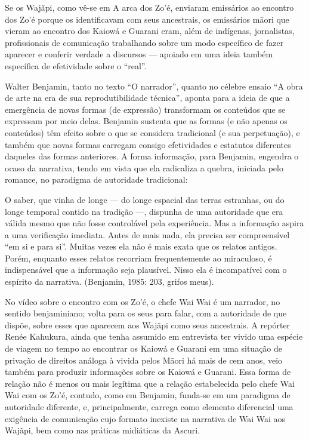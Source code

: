 Se os Wajãpi, como vê-se em A arca dos Zo’é, enviaram emissários ao
encontro dos Zo’é porque os identificavam com seus ancestrais, os
emissários m\=aori que vieram ao encontro dos Kaiowá e Guarani eram,
além de indígenas, jornalistas, profissionais de comunicação
trabalhando sobre um modo específico de fazer aparecer e conferir
verdade a discursos --- apoiado em uma ideia também específica de
efetividade sobre o ``real''.

Walter Benjamin, tanto no texto ``O narrador'', quanto no célebre ensaio ``A
obra de arte na era de sua reprodutibilidade técnica'', aponta para a
ideia de que a emergência de novas formas (de expressão) transformam os
conteúdos que se expressam por meio delas. Benjamin sustenta que as
formas (e não apenas os conteúdos) têm efeito sobre o que se considera
tradicional (e sua perpetuação), e também que novas formas carregam
consigo efetividades e estatutos diferentes daqueles das formas
anteriores. A forma informação, para Benjamin, engendra o ocaso da
narrativa, tendo em vista que ela radicaliza a quebra, iniciada pelo
romance, no paradigma de autoridade tradicional:

O saber, que vinha de longe --- do longe espacial das terras estranhas, ou
do longe temporal contido na tradição ---, dispunha de uma autoridade que
era válida mesmo que não fosse controlável pela experiência. Mas a
informação aspira a uma verificação imediata. Antes de mais nada, ela
precisa ser compreensível ``em si e para si''. Muitas vezes ela não é
mais exata que os relatos antigos. Porém, enquanto esses relatos
recorriam frequentemente ao miraculoso, é indispensável que a
informação seja plausível. Nisso ela é incompatível com o espírito da
narrativa. (Benjamin, 1985: 203, grifos meus).

No vídeo sobre o encontro com os Zo’é, o chefe Wai Wai é um narrador, no
sentido benjaminiano; volta para os seus para falar, com a autoridade de que dispõe, sobre esses que aparecem aos Wajãpi como seus
ancestrais. A repórter Renée Kahukura, ainda que tenha assumido em
entrevista ter vivido uma espécie de viagem no tempo ao encontrar os
Kaiowá e Guarani em uma situação de privação de direitos análoga à
vivida pelos M\=aori há mais de cem anos, veio também para produzir
informações sobre os Kaiowá e Guarani. Essa forma de relação não é
menos ou mais legítima que a relação estabelecida pelo chefe Wai Wai
com os Zo’é, contudo, como em Benjamin, funda-se em um paradigma de
autoridade diferente, e, principalmente, carrega como elemento
diferencial uma exigência de comunicação cujo formato inexiste na
narrativa de Wai Wai aos Wajãpi, bem como nas práticas midiáticas da
Ascuri.

